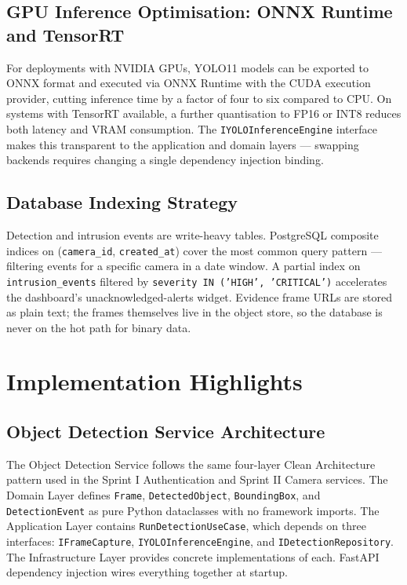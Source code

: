 \subsection{GPU Inference Optimisation: ONNX Runtime and TensorRT}
\label{subsec:s3_gpu}

\hspace{0.8cm}For deployments with NVIDIA GPUs, YOLO11 models can be exported to ONNX format and executed via ONNX Runtime with the CUDA execution provider, cutting inference time by a factor of four to six compared to CPU. On systems with TensorRT available, a further quantisation to FP16 or INT8 reduces both latency and VRAM consumption. The \texttt{IYOLOInferenceEngine} interface makes this transparent to the application and domain layers --- swapping backends requires changing a single dependency injection binding.

\subsection{Database Indexing Strategy}
\label{subsec:s3_db}

\hspace{0.8cm}Detection and intrusion events are write-heavy tables. PostgreSQL composite indices on (\texttt{camera\_id}, \texttt{created\_at}) cover the most common query pattern --- filtering events for a specific camera in a date window. A partial index on \texttt{intrusion\_events} filtered by \texttt{severity IN ('HIGH', 'CRITICAL')} accelerates the dashboard's unacknowledged-alerts widget. Evidence frame URLs are stored as plain text; the frames themselves live in the object store, so the database is never on the hot path for binary data.

\section{Implementation Highlights}
\label{sec:s3_impl}

\subsection{Object Detection Service Architecture}
\label{subsec:s3_detection_impl}

\hspace{0.8cm}The Object Detection Service follows the same four-layer Clean Architecture pattern used in the Sprint I Authentication and Sprint II Camera services. The Domain Layer defines \texttt{Frame}, \texttt{DetectedObject}, \texttt{BoundingBox}, and \texttt{DetectionEvent} as pure Python dataclasses with no framework imports. The Application Layer contains \texttt{RunDetectionUseCase}, which depends on three interfaces: \texttt{IFrameCapture}, \texttt{IYOLOInferenceEngine}, and \texttt{IDetectionRepository}. The Infrastructure Layer provides concrete implementations of each. FastAPI dependency injection wires everything together at startup.

